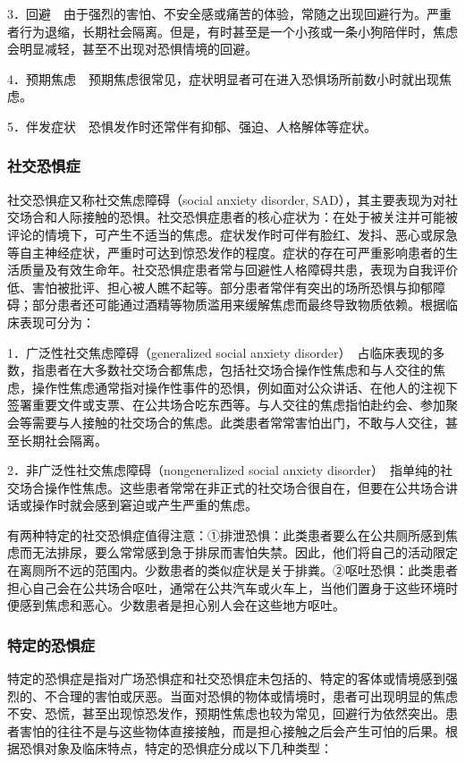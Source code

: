 3．回避　由于强烈的害怕、不安全感或痛苦的体验，常随之出现回避行为。严重者行为退缩，长期社会隔离。但是，有时甚至是一个小孩或一条小狗陪伴时，焦虑会明显减轻，甚至不出现对恐惧情境的回避。

4．预期焦虑　预期焦虑很常见，症状明显者可在进入恐惧场所前数小时就出现焦虑。

5．伴发症状　恐惧发作时还常伴有抑郁、强迫、人格解体等症状。

\subsubsection{社交恐惧症}

社交恐惧症又称社交焦虑障碍（social anxiety disorder,
SAD），其主要表现为对社交场合和人际接触的恐惧。社交恐惧症患者的核心症状为：在处于被关注并可能被评论的情境下，可产生不适当的焦虑。症状发作时可伴有脸红、发抖、恶心或尿急等自主神经症状，严重时可达到惊恐发作的程度。症状的存在可严重影响患者的生活质量及有效生命年。社交恐惧症患者常与回避性人格障碍共患，表现为自我评价低、害怕被批评、担心被人瞧不起等。部分患者常伴有突出的场所恐惧与抑郁障碍；部分患者还可能通过酒精等物质滥用来缓解焦虑而最终导致物质依赖。根据临床表现可分为：

1．广泛性社交焦虑障碍（generalized social anxiety
disorder）　占临床表现的多数，指患者在大多数社交场合都焦虑，包括社交场合操作性焦虑和与人交往的焦虑，操作性焦虑通常指对操作性事件的恐惧，例如面对公众讲话、在他人的注视下签署重要文件或支票、在公共场合吃东西等。与人交往的焦虑指怕赴约会、参加聚会等需要与人接触的社交场合的焦虑。此类患者常常害怕出门，不敢与人交往，甚至长期社会隔离。

2．非广泛性社交焦虑障碍（nongeneralized social anxiety
disorder）　指单纯的社交场合操作性焦虑。这些患者常常在非正式的社交场合很自在，但要在公共场合讲话或操作时就会感到窘迫或产生严重的焦虑。

有两种特定的社交恐惧症值得注意：①排泄恐惧：此类患者要么在公共厕所感到焦虑而无法排尿，要么常常感到急于排尿而害怕失禁。因此，他们将自己的活动限定在离厕所不远的范围内。少数患者的类似症状是关于排粪。②呕吐恐惧：此类患者担心自己会在公共场合呕吐，通常在公共汽车或火车上，当他们置身于这些环境时便感到焦虑和恶心。少数患者是担心别人会在这些地方呕吐。

\subsubsection{特定的恐惧症}

特定的恐惧症是指对广场恐惧症和社交恐惧症未包括的、特定的客体或情境感到强烈的、不合理的害怕或厌恶。当面对恐惧的物体或情境时，患者可出现明显的焦虑不安、恐慌，甚至出现惊恐发作，预期性焦虑也较为常见，回避行为依然突出。患者害怕的往往不是与这些物体直接接触，而是担心接触之后会产生可怕的后果。根据恐惧对象及临床特点，特定的恐惧症分成以下几种类型：

